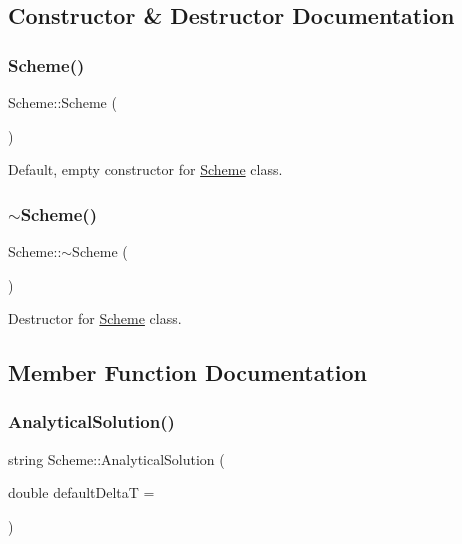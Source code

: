 \subsection{Constructor \& Destructor Documentation}
\mbox{\label{class_scheme_aa0b319a6594176dea40ca78562401b53}} 
\subsubsection{\texorpdfstring{Scheme()}{Scheme()}}
{\footnotesize\ttfamily Scheme\+::\+Scheme (\begin{DoxyParamCaption}{ }\end{DoxyParamCaption})}

Default, empty constructor for \mbox{\hyperlink{class_scheme}{Scheme}} class. \mbox{\label{class_scheme_af8f283786d3b27d97c55d92b9ae8b20b}} 
\subsubsection{\texorpdfstring{$\sim$\+Scheme()}{~Scheme()}}
{\footnotesize\ttfamily Scheme\+::$\sim$\+Scheme (\begin{DoxyParamCaption}{ }\end{DoxyParamCaption})\hspace{0.3cm}{\ttfamily [inline]}}

Destructor for \mbox{\hyperlink{class_scheme}{Scheme}} class. 

\subsection{Member Function Documentation}
\mbox{\label{class_scheme_a7d3e9f8133a955517471eb7a6fea355f}} 
\subsubsection{\texorpdfstring{Analytical\+Solution()}{AnalyticalSolution()}}
{\footnotesize\ttfamily string Scheme\+::\+Analytical\+Solution (\begin{DoxyParamCaption}\item[{double}]{default\+DeltaT = {} }\end{DoxyParamCaption})}

